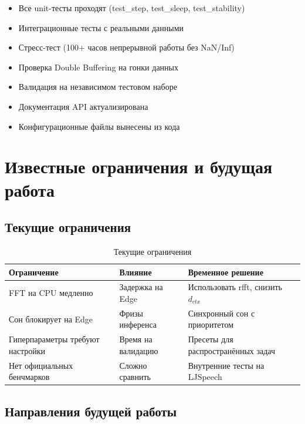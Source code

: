\begin{itemize}
    \item[$\square$] Все unit-тесты проходят (test\_step, test\_sleep, test\_stability)
    \item[$\square$] Интеграционные тесты с реальными данными
    \item[$\square$] Стресс-тест (100+ часов непрерывной работы без NaN/Inf)
    \item[$\square$] Проверка Double Buffering на гонки данных
    \item[$\square$] Валидация на независимом тестовом наборе
    \item[$\square$] Документация API актуализирована
    \item[$\square$] Конфигурационные файлы вынесены из кода
\end{itemize}

\section{Известные ограничения и будущая работа}

\subsection{Текущие ограничения}

\begin{table}[h]
\centering
\caption{Текущие ограничения}
\label{tab:limitations}
\begin{tabular}{lp{5cm}p{4cm}}
\toprule
\textbf{Ограничение} & \textbf{Влияние} & \textbf{Временное решение} \\
\midrule
FFT на CPU медленно & Задержка на Edge & Использовать rfft, снизить $d_{ctx}$ \\
Сон блокирует на Edge & Фризы инференса & Синхронный сон с приоритетом \\
Гиперпараметры требуют настройки & Время на валидацию & Пресеты для распространённых задач \\
Нет официальных бенчмарков & Сложно сравнить & Внутренние тесты на LJSpeech \\
\bottomrule
\end{tabular}
\end{table}

\subsection{Направления будущей работы}

